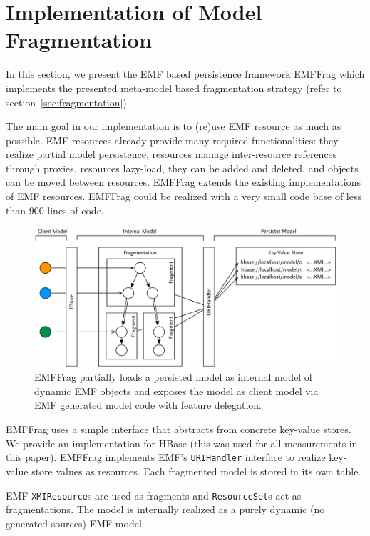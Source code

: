 \section{Implementation of Model Fragmentation}
\label{sec:implemention}

In this section, we present the EMF based persistence framework EMFFrag which implements the presented meta-model based fragmentation strategy (refer to section~\ref{sec:fragmentation}).

The main goal in our implementation is to (re)use EMF resource as much as possible. EMF resources already provide many required functionalities: they realize partial model persistence, resources manage inter-resource references through proxies, resources lazy-load, they can be added and deleted, and objects can be moved between resources. EMFFrag extends the existing implementations of EMF resources. EMFFrag could be realized with a very small code base of less than 900 lines of code.

\begin{figure}
  \centering
  \includegraphics[width=0.8\linewidth]{figures/simpleArchitecture}
  \caption{EMFFrag partially loads a persisted model as internal model of dynamic EMF objects and exposes the model as client model via EMF generated model code with feature delegation.}
  \label{fig:architecture}
\end{figure}

EMFFrag uses a simple interface that abstracts from concrete key-value stores. We provide an implementation for HBase (this was used for all measurements in this paper). EMFFrag implements EMF's \texttt{URIHandler} interface to realize key-value store values as resources. Each fragmented model is stored in its own table.

 EMF \texttt{XMIResource}s are used as fragments and \texttt{ResourceSet}s act as fragmentations. The model is internally realized as a purely dynamic (no generated sources) EMF model.

